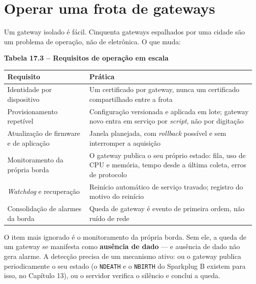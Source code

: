 \section{Operar uma frota de gateways}\label{operar-uma-frota-de-gateways}

Um gateway isolado é fácil. Cinquenta gateways espalhados por uma cidade são um problema de
operação, não de eletrônica. O que muda:

\textbf{Tabela 17.3 -- Requisitos de operação em escala}

\begin{longtable}[]{@{}
  >{\raggedright\arraybackslash}p{}
  >{\raggedright\arraybackslash}p{}@{}}
\toprule\noalign{}
\begin{minipage}[b]{\linewidth}\raggedright
Requisito
\end{minipage} & \begin{minipage}[b]{\linewidth}\raggedright
Prática
\end{minipage} \\
\midrule\noalign{}
\endhead
\bottomrule\noalign{}
\endlastfoot
Identidade por dispositivo & Um certificado por gateway, nunca um certificado compartilhado entre a frota \\
Provisionamento repetível & Configuração versionada e aplicada em lote; gateway novo entra em serviço por \emph{script}, não por digitação \\
Atualização de firmware e de aplicação & Janela planejada, com \emph{rollback} possível e sem interromper a aquisição \\
Monitoramento da própria borda & O gateway publica o seu próprio estado: fila, uso de CPU e memória, tempo desde a última coleta, erros de protocolo \\
\emph{Watchdog} e recuperação & Reinício automático de serviço travado; registro do motivo do reinício \\
Consolidação de alarmes da borda & Queda de gateway é evento de primeira ordem, não ruído de rede \\
\end{longtable}

O item mais ignorado é o monitoramento da própria borda. Sem ele, a queda de um gateway se manifesta
como \textbf{ausência de dado} --- e ausência de dado não gera alarme. A detecção precisa de um mecanismo
ativo: ou o gateway publica periodicamente o seu estado (o \passthrough{\lstinline!NDEATH!} e o \passthrough{\lstinline!NBIRTH!} do Sparkplug B
existem para isso, no Capítulo 13), ou o servidor verifica o silêncio e conclui a queda.

